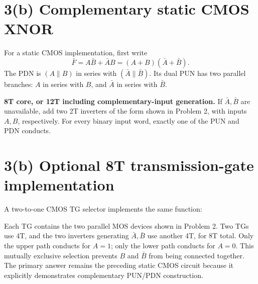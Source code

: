 \documentclass[11pt,a4paper]{article}
\newcommand{\answer}[1]{\par\noindent\colorbox{accent!9}{\parbox{0.96\linewidth}{#1}}\par}
\newcommand{\VDD}{V_{\mathrm{DD}}}
\newcommand{\VSS}{V_{\mathrm{SS}}}
\newcommand{\MOS}[5]{
  \coordinate (#1) at (#2,#3);
  \coordinate (#1t) at ($(#1)+(0,.55)$);
  \coordinate (#1b) at ($(#1)+(0,-.55)$);
  \draw (#1t)--($(#1)+(0,.30)$)--($(#1)+(-.18,.30)$);
  \draw ($(#1)+(-.18,.34)$)--($(#1)+(-.18,-.34)$);
  \draw ($(#1)+(-.18,-.30)$)--($(#1)+(0,-.30)$)--(#1b);
  \draw ($(#1)+(-.35,.33)$)--($(#1)+(-.35,-.33)$);
  \def\type{#5}\def\ptype{p}
  \ifx\type\ptype
    \draw ($(#1)+(-.78,0)$)--($(#1)+(-.53,0)$);
    \draw ($(#1)+(-.465,0)$) circle (.065);
    \draw ($(#1)+(-.40,0)$)--($(#1)+(-.35,0)$);
  \else
    \draw ($(#1)+(-.78,0)$)--($(#1)+(-.35,0)$);
  \fi
  \node[anchor=east] at ($(#1)+(-.82,0)$) {$#4$};
  \node[anchor=west,font=\scriptsize] at ($(#1)+(.10,0)$) {#1};
}
\begin{document}
\section*{3(b) Complementary static CMOS XNOR}
For a static CMOS implementation, first write
\[
 \bar F=A\bar B+\bar A B=(A+B)(\bar A+\bar B).
\]
The PDN is $(A\parallel B)$ in series with $(\bar A\parallel\bar B)$.
Its dual PUN has two parallel branches: $A$ in series with $B$, and
$\bar A$ in series with $\bar B$.
\begin{center}
\end{center}
\answer{\textbf{8T core, or 12T including complementary-input generation.}
If $\bar A,\bar B$ are unavailable, add two 2T inverters of the form shown in
Problem 2, with inputs $A,B$, respectively. For every binary input word,
exactly one of the PUN and PDN conducts.}

\newpage
\section*{3(b) Optional 8T transmission-gate implementation}
A two-to-one CMOS TG selector implements the same function:
\begin{center}
\end{center}
Each TG contains the two parallel MOS devices shown in Problem 2. Two TGs use
4T, and the two inverters generating $\bar A,\bar B$ use another 4T, for 8T total.
Only the upper path conducts for $A=1$; only the lower path conducts for $A=0$.
This mutually exclusive selection prevents $B$ and $\bar B$ from being connected
together. The primary answer remains the preceding static CMOS circuit because
it explicitly demonstrates complementary PUN/PDN construction.
\end{document}
